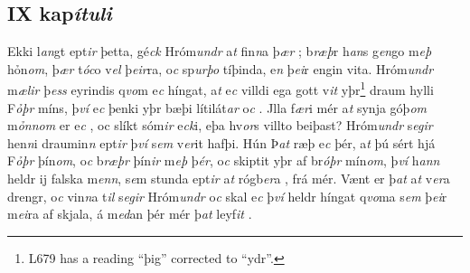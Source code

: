 \beginnumbering 
\pstart  
\vspace{5mm}\subsection*{IX kap\textit{ítuli}} 
Ekki l\textit{an}gt ept\textit{ir} þetta, 
gé\textit{ck} Hróm\-\textit{undr} a\textit{t} fin\textit{n}a þ\textit{ær} ; b\textit{ræþ}r  h\textit{an}s g\textit{en}go m\textit{eþ} hỏn\textit{om}, þ\textit{ær} t\textit{óc}o v\textit{el}  þ\textit{eir}ra, 
o\textit{c} sp\textit{urþo} tíþinda, e\textit{n} þ\textit{ei}r   engin vita. 
Hró\-m\textit{undr} m\textit{ælir} þ\textit{ess} eyrindis q\textit{vo}m e\textit{c} híngat, 
a\textit{t} e\textit{c} villdi ega gott v\textit{it} yþr\footnote{L679 has a reading \enquote{þig} corrected to \enquote{ydr}.}    draum hylli F\textit{ỏþr} míns, þ\textit{ví} e\textit{c} þenki yþr bæþi   lítilát\textit{ar}  o\textit{c} .   
Jlla f\textit{ær}i mér a\textit{t} synja góþ\textit{om} m\textit{ỏnnom}  er e\textit{c} , oc  slíkt  sóm\textit{ir}  e\textit{ck}i, eþa hv\textit{or}s villto beiþast?
Hróm\textit{undr} s\textit{egir} hen\textit{n}i  draumin\textit{n} ept\textit{ir} þ\textit{ví} s\textit{em} v\textit{er}it hafþi. Hún   Þ\textit{at} ræþ e\textit{c} þér,  a\textit{t} þú sért hjá
F\textit{ỏþr} þín\textit{om}, o\textit{c}  b\textit{ræþr} þín\textit{ir} m\textit{eþ} þ\textit{ér}, 
o\textit{c} skiptit yþr 
 af br\textit{óþr} mín\textit{om},
þ\textit{ví} h\textit{ann} heldr ij falska m\textit{enn}, s\textit{e}m  stunda ept\textit{ir} a\textit{t}  rógb\textit{er}a   , frá mér.  
Vænt er þ\textit{at} a\textit{t} v\textit{er}a  drengr, o\textit{c} vin\textit{n}a t\textit{il} s\textit{egir} Hróm\textit{undr} o\textit{c} skal e\textit{c} þ\textit{ví} heldr híngat  q\textit{vo}ma s\textit{em} þ\textit{ei}r m\textit{ei}ra af skjala, á m\textit{ed}an   þér mér þ\textit{at} leyf\textit{it}  . 
